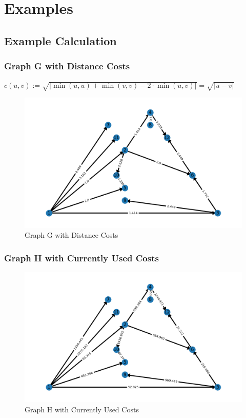 \documentclass[
	11pt, %
]{beamer}
\begin{document}
\section{Examples}
\subsection{Example Calculation}

\begin{frame}
	\frametitle{Graph G with Distance Costs}
	
	$c(u,v) := \sqrt{|\min(u,u)+\min(v,v)-2 \cdot \min(u,v)|} = \sqrt{|u-v|}$
	
	\begin{figure}
		\includegraphics[width=0.8\linewidth]{graphG.png}
		\caption{Graph G with Distance Costs}
	\end{figure}
\end{frame}

\begin{frame}
	\frametitle{Graph H with Currently Used Costs}
	
	\begin{figure}
		\includegraphics[width=0.8\linewidth]{graphH.png}
		\caption{Graph H with Currently Used Costs}
	\end{figure}
\end{frame}
\end{document}
